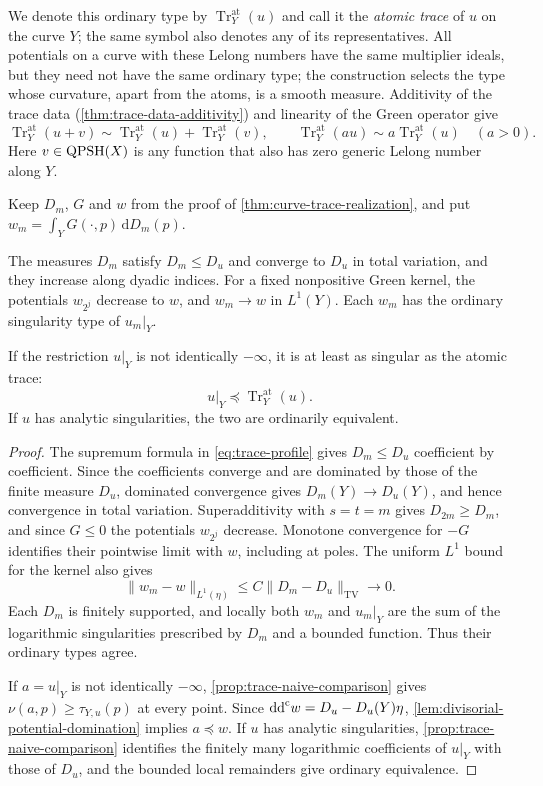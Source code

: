 We denote this ordinary type by $\operatorname{Tr}^{\mathrm{at}}_Y(u)$ and call it the \emph{atomic trace} of $u$ on the curve $Y$; the same symbol also denotes any of its representatives. All potentials on a curve with these Lelong numbers have the same multiplier ideals, but they need not have the same ordinary type; the construction selects the type whose curvature, apart from the atoms, is a smooth measure. Additivity of the trace data (\cref{thm:trace-data-additivity}) and linearity of the Green operator give
\[
 \operatorname{Tr}^{\mathrm{at}}_Y(u+v)
 \sim\operatorname{Tr}^{\mathrm{at}}_Y(u)+\operatorname{Tr}^{\mathrm{at}}_Y(v),
 \qquad
 \operatorname{Tr}^{\mathrm{at}}_Y(au)\sim a\operatorname{Tr}^{\mathrm{at}}_Y(u)
 \quad(a>0).
\]
Here $v\in\mathrm{QPSH}(X)$ is any function that also has zero generic Lelong number along $Y$.

Keep $D_m$, $G$ and $w$ from the proof of \cref{thm:curve-trace-realization}, and put $w_m=\int_YG(\cdot,p)\,\mathrm{d}D_m(p)$.

\begin{proposition}\label{prop:curve-trace-approximation}
The measures $D_m$ satisfy $D_m\leq D_u$ and converge to $D_u$ in total variation, and they increase along dyadic indices. For a fixed nonpositive Green kernel, the potentials $w_{2^j}$ decrease to $w$, and $w_m\to w$ in $L^1(Y)$. Each $w_m$ has the ordinary singularity type of $u_m|_Y$.

If the restriction $u|_Y$ is not identically $-\infty$, it is at least as singular as the atomic trace:
\[
 u|_Y\preceq \operatorname{Tr}^{\mathrm{at}}_Y(u).
\]
If $u$ has analytic singularities, the two are ordinarily equivalent.
\end{proposition}
\begin{proof}
The supremum formula in \eqref{eq:trace-profile} gives $D_m\leq D_u$ coefficient by coefficient. Since the coefficients converge and are dominated by those of the finite measure $D_u$, dominated convergence gives $D_m(Y)\to D_u(Y)$, and hence convergence in total variation. Superadditivity with $s=t=m$ gives $D_{2m}\geq D_m$, and since $G\leq0$ the potentials $w_{2^j}$ decrease. Monotone convergence for $-G$ identifies their pointwise limit with $w$, including at poles. The uniform $L^1$ bound for the kernel also gives
\[
 \|w_m-w\|_{L^1(\eta)}
 \leq C\|D_m-D_u\|_{\mathrm{TV}}\longrightarrow0.
\]
Each $D_m$ is finitely supported, and locally both $w_m$ and $u_m|_Y$ are the sum of the logarithmic singularities prescribed by $D_m$ and a bounded function. Thus their ordinary types agree.

If $a=u|_Y$ is not identically $-\infty$, \cref{prop:trace-naive-comparison} gives $\nu(a,p)\geq\tau_{Y,u}(p)$ at every point. Since $\mathrm{dd}^{\mathrm{c}} w=D_u-D_u(Y)\eta$, \cref{lem:divisorial-potential-domination} implies $a\preceq w$. If $u$ has analytic singularities, \cref{prop:trace-naive-comparison} identifies the finitely many logarithmic coefficients of $u|_Y$ with those of $D_u$, and the bounded local remainders give ordinary equivalence.
\end{proof}

